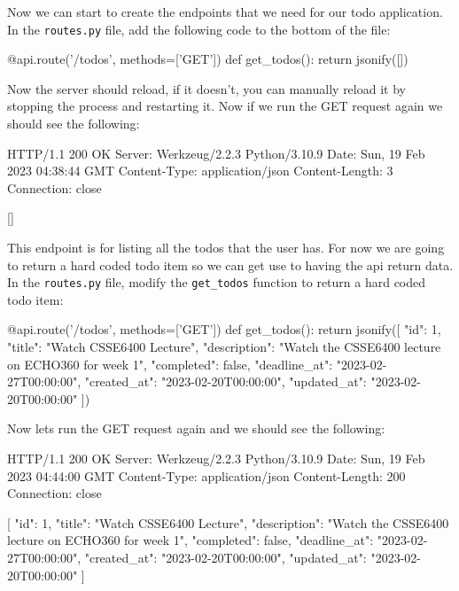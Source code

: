 \documentclass{csse4400}
\begin{document}
Now we can start to create the endpoints that we need for our todo application. In the \texttt{routes.py} file, add the following code to the bottom of the file:

\begin{code}[language=python]{}
@api.route('/todos', methods=['GET'])
def get_todos():
    return jsonify([])
\end{code}

Now the server should reload, if it doesn't, you can manually reload it by stopping the process and restarting it. Now if we run the GET request again we should see the following:

\begin{code}[language=json,numbers=none]{}
  HTTP/1.1 200 OK
  Server: Werkzeug/2.2.3 Python/3.10.9
  Date: Sun, 19 Feb 2023 04:38:44 GMT
  Content-Type: application/json
  Content-Length: 3
  Connection: close
  
  []
\end{code}

This endpoint is for listing all the todos that the user has. For now we are going to return a hard coded todo item so we can get use to having the api return data. In the \texttt{routes.py} file, modify the \texttt{get\_todos} function to return a hard coded todo item:

\begin{code}[language=python]{}
@api.route('/todos', methods=['GET'])
def get_todos():
    return jsonify([{
      "id": 1,
      "title": "Watch CSSE6400 Lecture",
      "description": "Watch the CSSE6400 lecture on ECHO360 for week 1",
      "completed": false,
      "deadline_at": "2023-02-27T00:00:00",
      "created_at": "2023-02-20T00:00:00",
      "updated_at": "2023-02-20T00:00:00"
    }])
\end{code}

Now lets run the GET request again and we should see the following:

\begin{code}[language=json,numbers=none]{}
  HTTP/1.1 200 OK
  Server: Werkzeug/2.2.3 Python/3.10.9
  Date: Sun, 19 Feb 2023 04:44:00 GMT
  Content-Type: application/json
  Content-Length: 200
  Connection: close
  
  [
    {
      "id": 1,
      "title": "Watch CSSE6400 Lecture",
      "description": "Watch the CSSE6400 lecture on ECHO360 for week 1",
      "completed": false,
      "deadline_at": "2023-02-27T00:00:00",
      "created_at": "2023-02-20T00:00:00",
      "updated_at": "2023-02-20T00:00:00"
    }
  ]
\end{code}
\end{document}
